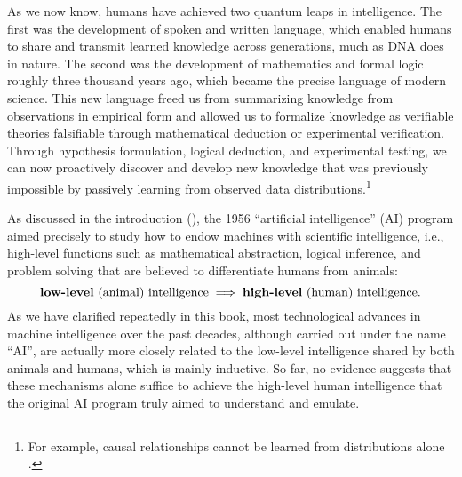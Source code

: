 \documentclass[../../book-main.tex]{subfiles}
\begin{document}
As we now know, humans have achieved two quantum leaps in intelligence. The first was the development of spoken and written language, which enabled humans to share and transmit learned knowledge across generations, much as DNA does in nature. The second was the development of mathematics and formal logic roughly three thousand years ago, which became the precise language of modern science. This new language freed us from summarizing knowledge from observations in empirical form and allowed us to formalize knowledge as verifiable theories falsifiable through mathematical deduction or experimental verification. Through hypothesis formulation, logical deduction, and experimental testing, we can now proactively discover and develop new knowledge that was previously impossible by passively learning from observed data distributions.\footnote{For example, causal relationships cannot be learned from distributions alone \cite{Pearl-2009}.}

As discussed in the introduction (), the 1956 ``artificial intelligence'' (AI) program aimed precisely to study how to endow machines with scientific intelligence, i.e., high-level functions such as mathematical abstraction, logical inference, and problem solving that are believed to differentiate humans from animals:
\begin{equation}
   \text{\textbf{low-level} (animal) intelligence} \; \Longrightarrow \; 
   \text{\textbf{high-level} (human) intelligence.}
\end{equation}
As we have clarified repeatedly in this book, most technological advances in machine intelligence over the past decades, although carried out under the name ``AI'', are actually more closely related to the low-level intelligence shared by both animals and humans, which is mainly inductive. So far, no evidence suggests that these mechanisms alone suffice to achieve the high-level human intelligence that the original AI program truly aimed to understand and emulate.
\end{document}
